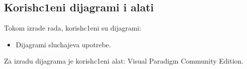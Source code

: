 \subsection{Korish\-c1eni dijagrami i alati}
Tokom izrade rada, korish\-c1eni su dijagrami:
\begin{itemize}
    \item Dijagrami sluchajeva upotrebe.
    
\end{itemize}
 
Za izradu dijagrama je korish\-c1eni alat: \selectfont
Visual Paradigm Community Edition.
\selectfont
